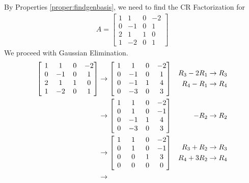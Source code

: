 \begin{solution}
By Properties \ref{proper:findgenbasis}, we need to find the CR Factorization for
\begin{align*}
A = 
\begin{bmatrix}
1 & 1 & 0 & -2\\
0 & -1 & 0 & 1\\
2 & 1 & 1 & 0\\
1 & -2 & 0 & 1
\end{bmatrix}
\end{align*}
We proceed with Gaussian Elimination.
\begin{align*}
\left[\begin{array}{@{\,}wc{10pt}wc{10pt}wc{10pt}wc{10pt}@{\,}}
1 & 1 & 0 & -2\\
0 & -1 & 0 & 1\\
2 & 1 & 1 & 0\\
1 & -2 & 0 & 1 
\end{array}
\right] &\to 
\left[\begin{array}{@{\,}wc{10pt}wc{10pt}wc{10pt}wc{10pt}@{\,}}
1 & 1 & 0 & -2\\
0 & -1 & 0 & 1\\
0 & -1 & 1 & 4\\
0 & -3 & 0 & 3 
\end{array}
\right] & 
\begin{aligned}
R_3 - 2R_1 &\to R_3 \\
R_4 - R_1 &\to R_4
\end{aligned} \\
&\to 
\left[\begin{array}{@{\,}wc{10pt}wc{10pt}wc{10pt}wc{10pt}@{\,}}
1 & 1 & 0 & -2\\
0 & 1 & 0 & -1\\
0 & -1 & 1 & 4\\
0 & -3 & 0 & 3 
\end{array}
\right] & 
-R_2 \to R_2 \\
&\to 
\left[\begin{array}{@{\,}wc{10pt}wc{10pt}wc{10pt}wc{10pt}@{\,}}
1 & 1 & 0 & -2\\
0 & 1 & 0 & -1\\
0 & 0 & 1 & 3\\
0 & 0 & 0 & 0 
\end{array}
\right] & 
\begin{aligned}
R_3 + R_2 &\to R_3 \\
R_4 + 3R_2 &\to R_4
\end{aligned} \\
&\to 

\end{align*}
\end{solution}
